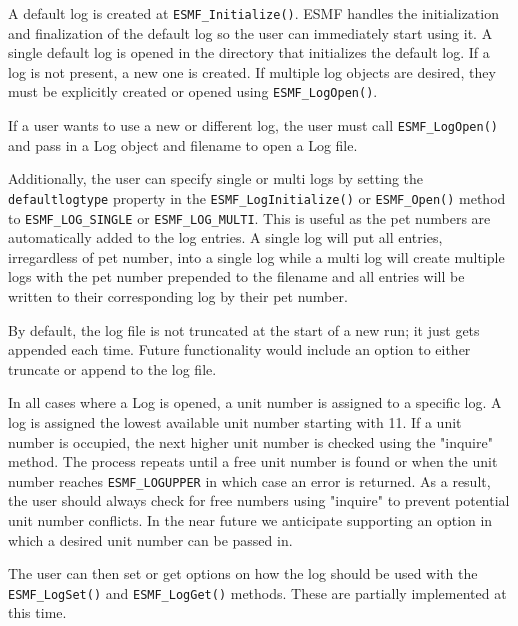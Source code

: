 

A default log is created at {\tt ESMF\_Initialize()}.  ESMF handles the 
initialization and finalization of the default log so the user can 
immediately start using it.  A single default log is opened in the directory
that initializes the default log.  If a log is not present, a new one is 
created.  If multiple log objects are desired, they must be explicitly created
or opened using {\tt ESMF\_LogOpen()}.

If a user wants to use a new or different log, the user must call
{\tt ESMF\_LogOpen()} and pass in a Log object and filename to open a Log file.

Additionally,  the user can specify single or multi logs by setting the
{\tt defaultlogtype} property in the {\tt ESMF\_LogInitialize()} or 
{\tt ESMF\_Open()} method to {\tt ESMF\_LOG\_SINGLE} or {\tt ESMF\_LOG\_MULTI}.
This is useful as the pet numbers are automatically added to the log entries.
A single log will put all entries, irregardless of pet number, into a single
log while a multi log will create multiple logs with the pet number prepended
to the filename and all entries will be written to their corresponding log 
by their pet number.
 
By default, the log file is not truncated at the start of a new run; it just
gets appended each time.  Future functionality would include an option to
either truncate or append to the log file. 

In all cases where a Log is opened, a unit number is assigned to a specific
log.  A log is assigned the lowest available unit number starting with
11.  If a unit number is occupied, the next higher unit number is 
checked using the "inquire" method.  The process repeats until a free unit 
number is found or when the unit number reaches {\tt ESMF\_LOGUPPER} in 
which case an error is returned.  As a result, the user should always check
for free numbers using "inquire" to prevent potential unit number conflicts.
In the near future we anticipate supporting an option in which a desired
unit number can be passed in.

The user can then set or get options on how the log should be used 
with the {\tt ESMF\_LogSet()} and {\tt ESMF\_LogGet()} methods.  These are 
partially implemented at this time. 

